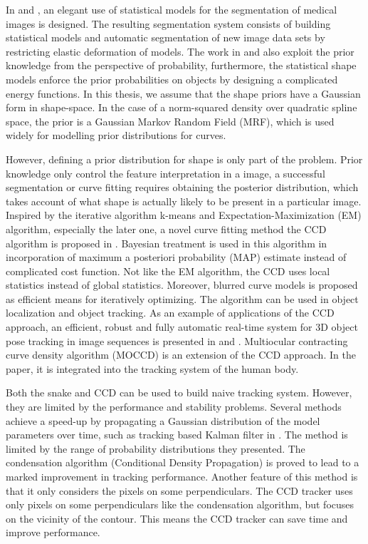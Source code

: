 In \cite{kelemen1999three} and \cite{kelemen1999elastic}, an elegant
use of statistical models for the segmentation of medical images is
designed.  The resulting segmentation system consists of building
statistical models and automatic segmentation of new image data
sets by restricting elastic deformation of models.  The work in
\cite{sclaroff2001deformable} and \cite{liu1999deformable} also
exploit the prior knowledge from the perspective of probability,
furthermore, the statistical shape models enforce the prior
probabilities on objects by designing a complicated energy functions.  In this thesis, we assume that the shape priors have a Gaussian form in
shape-space. In the case of a norm-squared density over  quadratic spline space,
the prior is a Gaussian Markov Random Field
(MRF)\cite{blake1998active}, which is used widely  for modelling prior
distributions for curves\cite{storvik1994bayesian}.


However, defining a prior distribution for shape is only part of the
problem. Prior knowledge only control the feature interpretation in a
image, a successful segmentation or curve fitting requires
obtaining the posterior distribution, which takes account of what
shape is actually likely to be present in a particular image. Inspired
by the iterative algorithm k-means\cite{ding2004k} and
Expectation-Maximization (EM)\cite{dempster1977maximum} algorithm, especially the later one, a novel
curve fitting method the CCD algorithm is proposed in
\cite{hanek2004contracting}. Bayesian treatment is used in this
algorithm in incorporation of maximum a posteriori probability (MAP)
\cite{sorenson1980parameter} estimate instead of complicated cost
function. Not like the EM algorithm, the CCD uses local statistics
instead of global statistics. Moreover, blurred curve models is
proposed as efficient means for iteratively optimizing. The algorithm
can be used in object localization and object tracking. As an example
of applications of the CCD approach, an efficient, robust and fully
automatic real-time system for 3D object pose tracking in
image sequences is presented in \cite{panin2006fully} and
\cite{panin2006efficient}. Multiocular contracting curve density
algorithm (MOCCD) \cite{hahn2007tracking} is an extension of the CCD
approach. In the paper, it is integrated into the tracking system of the human body. 

Both the snake and CCD can be used to build naive tracking
system. However, they are limited by the performance and stability
problems. Several methods achieve a speed-up by propagating a Gaussian
distribution of the model parameters over time, such as tracking based
Kalman filter in \cite{brookner1998tracking}. The method is limited by the range of probability
distributions they presented. The condensation algorithm (Conditional
Density Propagation) \cite{isard1998icondensation} is proved to lead
to a marked improvement in tracking performance. Another feature of
this method is that it only considers the pixels on some
perpendiculars. The CCD tracker \cite{hanek2004fitting} uses only
pixels on some perpendiculars like the condensation algorithm, but
focuses on the vicinity of the contour. This means the CCD tracker can
save time and improve performance.


